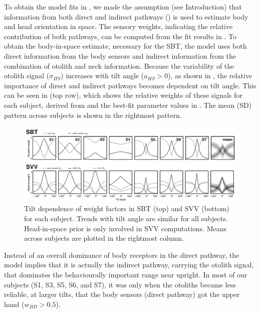 To obtain the model fits in , we made the assumption (see Introduction) that information from both direct and indirect pathways () is used to estimate body and head orientation in space. The sensory weights, indicating the relative contribution of both pathways, can be computed from the fit results in . To obtain the body-in-space estimate, necessary for the SBT, the model uses both direct information from the body sensors and indirect information from the combination of otolith and neck information. Because the variability of the otolith signal ($\sigma_{HS}$) increases with tilt angle ($a_{HS} > 0$), as shown in , the relative importance of direct and indirect pathways becomes dependent on tilt angle. This can be seen in  (top row), which shows the relative weights of these signals for each subject, derived from  and the best-fit parameter values in . The mean (\textpm SD) pattern across subjects is shown in the rightmost pattern.

\begin{figure}
    \includegraphics[width=1.0\textwidth]{src/paper1/figure5.pdf}

    \caption{Tilt dependence of weight factors in SBT (top) and SVV (bottom) for each subject. Trends with tilt angle are similar for all subjects. Head-in-space prior is only involved in SVV computations. Means across subjects are plotted in the rightmost column.}
    \label{p1:fig5}
\end{figure}

Instead of an overall dominance of body receptors in the direct pathway, the model implies that it is actually the indirect pathway, carrying the otolith signal, that dominates the behaviourally important range near upright. In most of our subjects (S1, S3, S5, S6, and S7), it was only when the otoliths became less reliable, at larger tilts, that the body sensors (direct pathway) got the upper hand ($w_{BD} > 0.5$).

